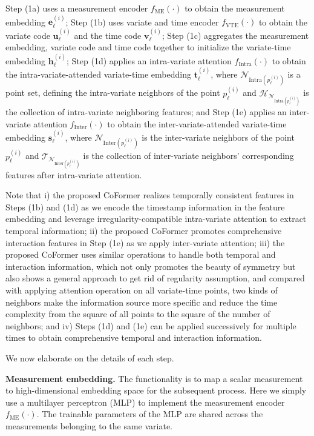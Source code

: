 \documentclass[twocolumn]{article}
\begin{document}
Step (1a) uses a measurement encoder $f_{\text{ME}}(\cdot)$ to obtain the measurement embedding $\mathbf{e}_\ell^{(i)}$; Step (1b) uses variate and time encoder $f_{\text{VTE}}(\cdot)$ to obtain the variate code $\mathbf{u}_\ell^{(i)}$ and the time code $\mathbf{v}_\ell^{(i)}$; Step (1c) aggregates the measurement embedding, variate code and time code together to initialize the variate-time embedding $\mathbf{h}_\ell^{(i)}$; Step (1d) applies an intra-variate attention $f_{\text{Intra}}(\cdot)$ to obtain the intra-variate-attended variate-time embedding $\mathbf{t}_\ell^{(i)}$, where $\mathcal{N}_{\text{Intra}(p_\ell^{(i)})}$ is a point set, defining the intra-variate neighbors of the point $p_\ell^{(i)}$ and $\mathcal{H}_{\mathcal{N}_{\text{Intra}(p_\ell^{(i)})}}$ is the collection of intra-variate neighboring features; and Step (1e) applies an inter-variate attention $f_{\text{Inter}}(\cdot)$ to obtain the inter-variate-attended variate-time embedding $\mathbf{s}_\ell^{(i)}$, where $\mathcal{N}_{\text{Inter}(p_\ell^{(i)})}$ is the inter-variate neighbors of the point $p_\ell^{(i)}$ and $\mathcal{T}_{\mathcal{N}_{\text{Inter}(p_\ell^{(i)})}}$ is the collection of inter-variate neighbors' corresponding features after intra-variate attention.

Note that i) the proposed CoFormer realizes temporally consistent features in Steps (1b) and (1d) as we encode the timestamp information in the feature embedding and leverage irregularity-compatible intra-variate attention to extract temporal information; ii) the proposed CoFormer promotes comprehensive interaction features in Step (1e) as we apply inter-variate attention; iii) the proposed CoFormer uses similar operations to handle both temporal and interaction information, which not only promotes the beauty of symmetry but also shows a general approach to get rid of regularity assumption, and compared with applying attention operation on all variate-time points, two kinds of neighbors make the information source more specific and reduce the time complexity from the square of all points to the square of the number of neighbors; and iv) Steps (1d) and (1e) can be applied successively for multiple times to obtain comprehensive temporal and interaction information.

We now elaborate on the details of each step.

\textbf{Measurement embedding.} The functionality is to map a scalar measurement to high-dimensional embedding space for the subsequent process. Here we simply use a multilayer perceptron (MLP) to implement the measurement encoder $f_{\text{ME}}(\cdot)$. The trainable parameters of the MLP are shared across the measurements belonging to the same variate.
\end{document}
